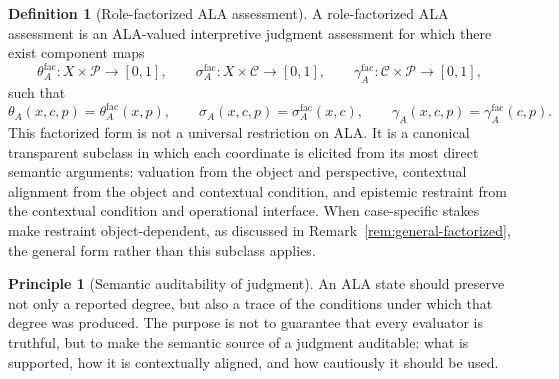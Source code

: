\documentclass[reqno,final]{amsart}
\theoremstyle{definition}
\newtheorem{definition}{Definition}
\newtheorem{principle}{Principle}
\theoremstyle{plain}
\theoremstyle{remark}
\providecommand{\cC}{\mathcal{C}}
\providecommand{\cP}{\mathcal{P}}
\begin{document}
\begin{definition}[Role-factorized ALA assessment]
\label{def:role-factorized}
A role-factorized ALA assessment is an ALA-valued interpretive judgment assessment for which there exist component maps
\[
\theta_A^{\mathrm{fac}}:X\times\cP\to[0,1],\qquad
\sigma_A^{\mathrm{fac}}:X\times\cC\to[0,1],\qquad
\gamma_A^{\mathrm{fac}}:\cC\times\cP\to[0,1],
\]
such that
\[
\theta_A(x,c,p)=\theta_A^{\mathrm{fac}}(x,p),
\qquad
\sigma_A(x,c,p)=\sigma_A^{\mathrm{fac}}(x,c),
\qquad
\gamma_A(x,c,p)=\gamma_A^{\mathrm{fac}}(c,p).
\]
This factorized form is not a universal restriction on ALA. It is a canonical transparent subclass in which each coordinate is elicited from its most direct semantic arguments: valuation from the object and perspective, contextual alignment from the object and contextual condition, and epistemic restraint from the contextual condition and operational interface. When case-specific stakes make restraint object-dependent, as discussed in Remark~\ref{rem:general-factorized}, the general form rather than this subclass applies.
\end{definition}

\begin{principle}[Semantic auditability of judgment]
An ALA state should preserve not only a reported degree, but also a trace of the conditions under which that degree was produced. The purpose is not to guarantee that every evaluator is truthful, but to make the semantic source of a judgment auditable: what is supported, how it is contextually aligned, and how cautiously it should be used.
\end{principle}
\end{document}
